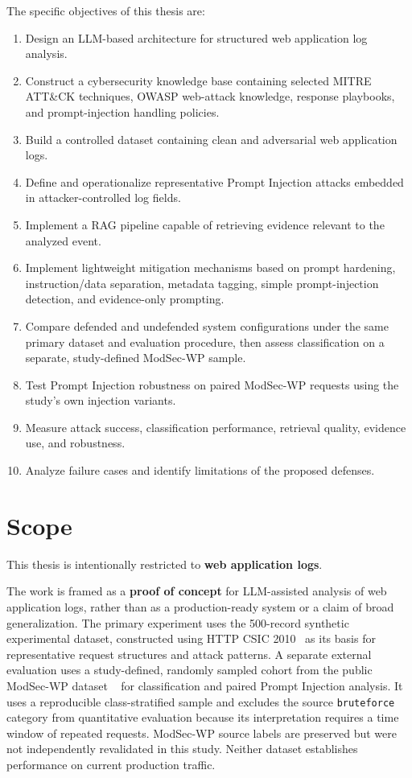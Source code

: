The specific objectives of this thesis are:

\begin{enumerate}
\def\labelenumi{\arabic{enumi}.}
\tightlist
\item
  Design an LLM-based architecture for structured web application log
  analysis.
\item
  Construct a cybersecurity knowledge base containing selected MITRE
  ATT\&CK techniques, OWASP web-attack knowledge, response playbooks,
  and prompt-injection handling policies.
\item
  Build a controlled dataset containing clean and adversarial web
  application logs.
\item
  Define and operationalize representative Prompt Injection attacks
  embedded in attacker-controlled log fields.
\item
  Implement a RAG pipeline capable of retrieving evidence relevant to
  the analyzed event.
\item
  Implement lightweight mitigation mechanisms based on prompt hardening,
  instruction/data separation, metadata tagging, simple prompt-injection
  detection, and evidence-only prompting.
\item
  Compare defended and undefended system configurations under the same
  primary dataset and evaluation procedure, then assess classification
  on a separate, study-defined ModSec-WP sample.
\item
  Test Prompt Injection robustness on paired ModSec-WP requests using
  the study's own injection variants.
\item
  Measure attack success, classification performance, retrieval quality,
  evidence use, and robustness.
\item
  Analyze failure cases and identify limitations of the proposed
  defenses.
\end{enumerate}

\section{Scope}\label{scope}

This thesis is intentionally restricted to \textbf{web application
logs}.

The work is framed as a \textbf{proof of concept} for LLM-assisted
analysis of web application logs, rather than as a production-ready
system or a claim of broad generalization. The primary experiment uses
the 500-record synthetic experimental dataset, constructed using HTTP
CSIC 2010~\cite{csic2010dataset} as its basis for representative request
structures and attack patterns. A separate external evaluation uses a
study-defined, randomly sampled cohort from the public ModSec-WP dataset
~\cite{modsecwp2026dataset} for classification and paired Prompt
Injection analysis. It uses a reproducible class-stratified sample and
excludes the source \texttt{bruteforce} category from quantitative
evaluation because its interpretation requires a time window of repeated
requests. ModSec-WP source labels are preserved but were not independently
revalidated in this study. Neither dataset establishes performance on
current production traffic.

